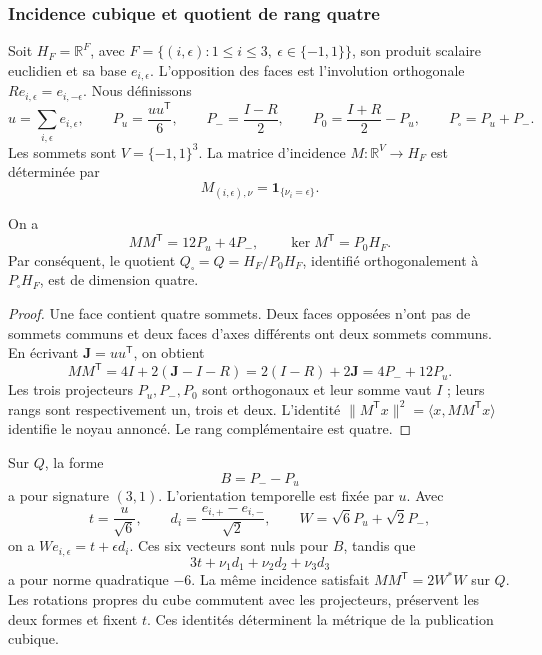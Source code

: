 \subsubsection{Incidence cubique et quotient de rang quatre}
\label{ii:vii:sec:cociente-pantalla}

Soit \(H_F=\mathbb R^F\), avec
\(F=\{(i,\epsilon):1\leq i\leq3,\ \epsilon\in\{-1,1\}\}\),
son produit scalaire euclidien et sa base \(e_{i,\epsilon}\).
L'opposition des faces est l'involution orthogonale
\(Re_{i,\epsilon}=e_{i,-\epsilon}\). Nous définissons
\[
 u=\sum_{i,\epsilon}e_{i,\epsilon},\qquad
 P_u=\frac{uu^{\mathsf T}}6,\qquad P_-=\frac{I-R}{2},\qquad
 P_0=\frac{I+R}{2}-P_u,\qquad P_\square=P_u+P_-.
\]
Les sommets sont \(V=\{-1,1\}^3\). La matrice d'incidence \(M:\mathbb R^V\longrightarrow H_F\) est déterminée par
\[
 M_{(i,\epsilon),\nu}=\mathbf1_{\{\nu_i=\epsilon\}}.
\]

\begin{proposition}
\label{ii:vii:prop:incidencia}
On a
\[
 MM^{\mathsf T}=12P_u+4P_-,
 \qquad
 \ker M^{\mathsf T}=P_0H_F.
\]
Par conséquent, le quotient
\(Q_\square=Q=H_F/P_0H_F\), identifié orthogonalement à
\(P_\square H_F\), est de dimension quatre.
\end{proposition}

\begin{proof}
Une face contient quatre sommets. Deux faces opposées n'ont pas de sommets
communs et deux faces d'axes différents ont deux sommets communs.
En écrivant \(\mathbf J=uu^{\mathsf T}\), on obtient
\[
 MM^{\mathsf T}=4I+2(\mathbf J-I-R)
 =2(I-R)+2\mathbf J=4P_-+12P_u.
\]
Les trois projecteurs \(P_u,P_-,P_0\) sont orthogonaux et leur somme vaut \(I\) ; leurs rangs sont respectivement un, trois et deux. L'identité \(\|M^{\mathsf T}x\|^2=\langle x,MM^{\mathsf T}x\rangle\) identifie le noyau annoncé. Le rang complémentaire est quatre.
\end{proof}

Sur \(Q\), la forme
\[
 B=P_--P_u
\]
a pour signature \((3,1)\). L'orientation temporelle est fixée par \(u\).
Avec
\[
 t=\frac{u}{\sqrt6},\qquad
 d_i=\frac{e_{i,+}-e_{i,-}}{\sqrt2},\qquad
 W=\sqrt6P_u+\sqrt2P_-,
\]
on a \(We_{i,\epsilon}=t+\epsilon d_i\). Ces six vecteurs
sont nuls pour \(B\), tandis que
\[
 3t+\nu_1d_1+\nu_2d_2+\nu_3d_3
\]
a pour norme quadratique \(-6\). La même incidence satisfait
\(MM^{\mathsf T}=2W^*W\) sur \(Q\). Les rotations propres du cube
commutent avec les projecteurs, préservent les deux formes et fixent \(t\).
Ces identités déterminent la métrique de la publication cubique.

